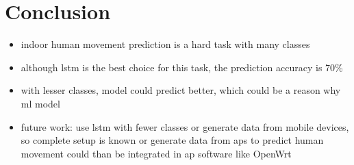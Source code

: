 \chapter{Conclusion}\label{ch:conclusion}

\begin{itemize}
    \item indoor human movement prediction is a hard task with many classes
    \item although \ac{lstm} is the best choice for this task, the prediction accuracy is 70\%
    \item with lesser classes, model could predict better, which could be a reason why \ac{ml} model 
    \item future work: use \ac{lstm} with fewer classes 
    \subitem or generate data from mobile devices, so complete setup is known
    \subitem or generate data from \acp{ap} to predict human movement 
    \subitem could than be integrated in \acs{ap} software like OpenWrt
\end{itemize}

